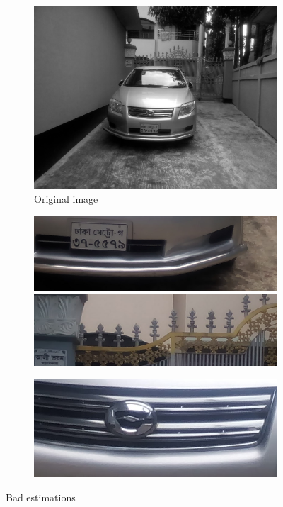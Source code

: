 \begin{figure}
\begin{subfigure}{0.5\textwidth}
    \centering
    \includegraphics[width=0.9\linewidth]{./img/experiment/stage.2/small}
    \caption{Original image}
\end{subfigure}
\begin{subfigure}{0.24\textwidth}
    \centering
    \includegraphics[width=0.9\linewidth]{./img/experiment/stage.8/00-small}
    \\ \vspace{0.3cm}
    \includegraphics[width=0.9\linewidth]{./img/experiment/stage.8/02-small}
\end{subfigure}
\begin{subfigure}{0.24\textwidth}
    \centering
    \includegraphics[width=0.9\linewidth]{./img/experiment/stage.8/01-small}
\end{subfigure}
\caption{Bad estimations}
\label{fig:Estimate2}
\end{figure}

